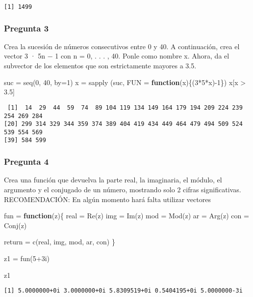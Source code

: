 \documentclass[
]{article}
\newenvironment{Shaded}{\begin{snugshade}}{\end{snugshade}}
\newcommand{\AttributeTok}[1]{\textcolor[rgb]{0.77,0.63,0.00}{#1}}
\newcommand{\ControlFlowTok}[1]{\textcolor[rgb]{0.13,0.29,0.53}{\textbf{#1}}}
\newcommand{\DecValTok}[1]{\textcolor[rgb]{0.00,0.00,0.81}{#1}}
\newcommand{\FloatTok}[1]{\textcolor[rgb]{0.00,0.00,0.81}{#1}}
\newcommand{\FunctionTok}[1]{\textcolor[rgb]{0.00,0.00,0.00}{#1}}
\newcommand{\NormalTok}[1]{#1}
\newcommand{\OtherTok}[1]{\textcolor[rgb]{0.56,0.35,0.01}{#1}}
\newcommand{\SpecialCharTok}[1]{\textcolor[rgb]{0.00,0.00,0.00}{#1}}
\begin{document}
\begin{verbatim}
[1] 1499
\end{verbatim}

\hypertarget{pregunta-3}{%
\subsubsection{Pregunta 3}\label{pregunta-3}}

Crea la sucesión de números consecutivos entre 0 y 40. A continuación,
crea el vector 3 · 5n − 1 con n = 0, . . . , 40. Ponle como nombre x.
Ahora, da el subvector de los elementos que son estrictamente mayores a
3.5.

\begin{Shaded}
\begin{Highlighting}[]
\NormalTok{suc }\OtherTok{=} \FunctionTok{seq}\NormalTok{(}\DecValTok{0}\NormalTok{, }\DecValTok{40}\NormalTok{, }\AttributeTok{by=}\DecValTok{1}\NormalTok{)}
\NormalTok{x }\OtherTok{=} \FunctionTok{sapply}\NormalTok{ (suc, }\AttributeTok{FUN =} \ControlFlowTok{function}\NormalTok{(x)\{(}\DecValTok{3}\SpecialCharTok{*}\DecValTok{5}\SpecialCharTok{*}\NormalTok{x)}\SpecialCharTok{{-}}\DecValTok{1}\NormalTok{\}) }
\NormalTok{x[x }\SpecialCharTok{\textgreater{}} \FloatTok{3.5}\NormalTok{]}
\end{Highlighting}
\end{Shaded}

\begin{verbatim}
 [1]  14  29  44  59  74  89 104 119 134 149 164 179 194 209 224 239 254 269 284
[20] 299 314 329 344 359 374 389 404 419 434 449 464 479 494 509 524 539 554 569
[39] 584 599
\end{verbatim}

\hypertarget{pregunta-4}{%
\subsubsection{Pregunta 4}\label{pregunta-4}}

Crea una función que devuelva la parte real, la imaginaria, el módulo,
el argumento y el conjugado de un número, mostrando solo 2 cifras
significativas. RECOMENDACIÓN: En algún momento hará falta utilizar
vectores

\begin{Shaded}
\begin{Highlighting}[]
\NormalTok{fun }\OtherTok{=} \ControlFlowTok{function}\NormalTok{(z)\{}
\NormalTok{  real }\OtherTok{=} \FunctionTok{Re}\NormalTok{(z)}
\NormalTok{  img }\OtherTok{=} \FunctionTok{Im}\NormalTok{(z)}
\NormalTok{  mod }\OtherTok{=} \FunctionTok{Mod}\NormalTok{(z)}
\NormalTok{  ar }\OtherTok{=} \FunctionTok{Arg}\NormalTok{(z)}
\NormalTok{  con }\OtherTok{=} \FunctionTok{Conj}\NormalTok{(z)}
  
\NormalTok{  return }\OtherTok{=} \FunctionTok{c}\NormalTok{(real, img, mod, ar, con)}
\NormalTok{\}}

\NormalTok{z1 }\OtherTok{=} \FunctionTok{fun}\NormalTok{(}\DecValTok{5}\SpecialCharTok{+}\NormalTok{3i)}

\NormalTok{z1}
\end{Highlighting}
\end{Shaded}

\begin{verbatim}
[1] 5.0000000+0i 3.0000000+0i 5.8309519+0i 0.5404195+0i 5.0000000-3i
\end{verbatim}
\end{document}
